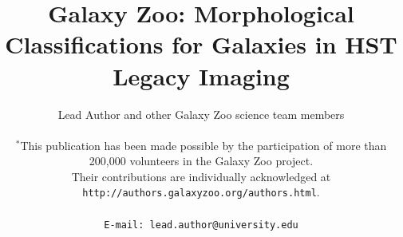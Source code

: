 \documentclass[usenatbib]{mn2e}
\newcommand{\etal}{{\it et al.}}
\begin{document}
\title[Galaxy Zoo Hubble Data]{Galaxy Zoo: Morphological Classifications for Galaxies in HST Legacy Imaging}
\author[Lead Author \etal]{Lead Author and other Galaxy Zoo science team members\\
\\
 $^*$This publication has been made possible by the participation of more than 200,000 volunteers in the Galaxy Zoo project. \\ Their contributions are individually acknowledged at \texttt{http://authors.galaxyzoo.org/authors.html}. \\
\\
{\tt E-mail: lead.author@university.edu}
 }


\maketitle
\end{document}
